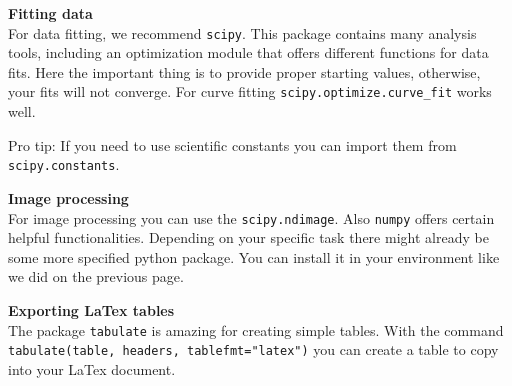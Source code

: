 \documentclass{article}
\begin{document}
\noindent
\begin{minipage}{.5\textwidth}
\textbf{\large Fitting data}\\
For data fitting, we recommend \lstinline{scipy}. This package contains many analysis tools, including an optimization module that offers different functions for data fits. Here the important thing is to provide proper starting values, otherwise, your fits will not converge. For curve fitting \lstinline{scipy.optimize.curve_fit} works well.

Pro tip: If you need to use scientific constants you can import them from \lstinline{scipy.constants}.

\vspace{5pt}

\textbf{\large Image processing}\\
For image processing you can use the \lstinline{scipy.ndimage}. Also \lstinline{numpy} offers certain helpful functionalities. Depending on your specific task there might already be some more specified python package. You can install it in your environment like we did on the previous page. 

\vspace{5pt}

\textbf{\large Exporting LaTex tables}\\
The package \lstinline{tabulate} is amazing for creating simple tables. With the command \lstinline{tabulate(table, headers, tablefmt="latex")} you can create a table to copy into your LaTex document. 


\end{minipage}%
\end{document}
